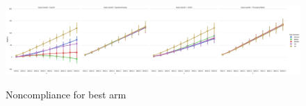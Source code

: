 \begin{figure}[t]
	\centering	
	\includegraphics[width=1\textwidth, angle=90]{bandit/figs/ex4.png}\hspace{1cm}
	\label{fig:ex4}
	\caption{Noncompliance for best arm}
\end{figure}









